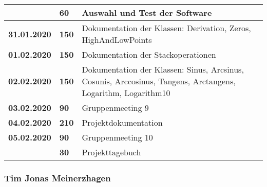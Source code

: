 {\begin{longtable}{|l|l|p{11cm}|}
		& \textbf{\hfill 60} & Auswahl und Test der Software
		\\ \hline \textbf{31.01.2020}
		& \textbf{\hfill 150} & Dokumentation der Klassen: Derivation, Zeros, HighAndLowPoints
		\\ \hline \textbf{01.02.2020}
		& \textbf{\hfill 150} & Dokumentation der Stackoperationen
		\\ \hline \textbf{02.02.2020}
		& \textbf{\hfill 150} & Dokumentation der Klassen: Sinus, Arcsinus, Cosunis, Arccosinus, Tangens, Arctangens, Logarithm, Logarithm10
		\\ \hline \textbf{03.02.2020}
		& \textbf{\hfill 90} & Gruppenmeeting 9
		\\ \hline \textbf{04.02.2020}
		& \textbf{\hfill 210} & Projektdokumentation
		\\ \hline \textbf{05.02.2020}
		& \textbf{\hfill 90} & Gruppenmeeting 10 \\\cline{2-3}
		& \textbf{\hfill 30} & Projekttagebuch  
		\\ \hline
	\end{longtable}
}

\clearpage

\subsubsection{Tim Jonas Meinerzhagen}


